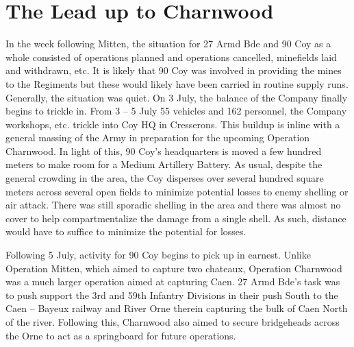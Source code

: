 \documentclass[noraggedright]{turabian-researchpaper}
\begin{document}

\section{The Lead up to Charnwood}

In the week following Mitten, the situation for 27 Armd Bde and 90 Coy as a 
whole consisted of operations planned and operations cancelled, minefields laid
and withdrawn, etc.  It is likely that 90 Coy was involved in providing the 
mines to the Regiments but these would likely have been carried in routine 
supply runs.  Generally, the situation was quiet.  On 3 July, the balance of
the Company finally begins to trickle in.  From 3 -- 5 July 55 vehicles and
162 personnel, the Company workshops, etc. trickle into Coy HQ in Cresserons.
This buildup is inline with a general massing of the Army in preparation for
the upcoming Operation Charnwood.  In light of this, 90 Coy's headquarters is
moved a few hundred meters to make room for a Medium Artillery Battery.  As
usual, despite the general crowding in the area, the Coy disperses over several
hundred square meters across several open fields to minimize potential losses
to enemy shelling or air attack.\autocite[1 -- 5 July 1944]{90wd}  
There was still sporadic shelling in the 
area and there was almost no cover to help compartmentalize the damage from a
single shell.\autocite[5 July 1944]{27wd}  As such, distance would have to 
suffice to minimize the potential for losses.  %

Following 5 July, activity for 90 Coy begins to pick up in earnest.  
Unlike Operation Mitten, which aimed to capture two chateaux,  Operation 
Charnwood was a much larger operation aimed at capturing Caen.  27 Armd Bde's
task was to push support the 3rd and 59th Infantry Divisions in their push 
South to the Caen -- Bayeux railway and River Orne therein capturing the bulk 
of Caen North of the river.  
Following this, Charnwood also aimed to secure bridgeheads 
across the Orne to act as a springboard for future operations.\autocite
[Operation Charnwood, 27th Armoured Brigade Operation Order No 2 (See appendix
to July diary following papers pertaining to Goodwood)]{27wd}
\end{document}
